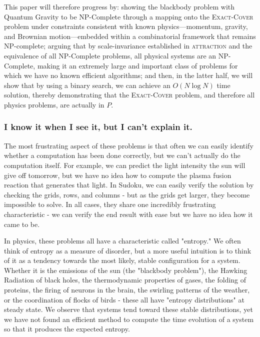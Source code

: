 \documentclass{report}
\begin{document}
This paper will therefore progress by: showing the blackbody problem with Quantum Gravity to be NP-Complete through a mapping onto the \textsc{Exact-Cover} problem under constraints consistent with known physics—momentum, gravity, and Brownian motion—embedded within a combinatorial framework that remains NP-complete; arguing that by scale-invariance established in \textsc{attraction}\cite{AbadirAttraction2024} and the equivalence of all NP-Complete problems, all physical systems are an NP-Complete, making it an extremely large and important class of problems for which we have no known efficient algorithms; and then, in the latter half, we will show that by using a binary search, we can achieve an \(O(N \log N)\) time solution, thereby demonstrating that the \textsc{Exact-Cover} problem, and therefore all physics problems, are actually in \(P\).


\subsubsection*{I know it when I see it, but I can't explain it.}
The most frustrating aspect of these problems is that often we can easily identify whether a computation has been done correctly, but we can't actually do the computation itself. For example, we can predict the light intensity the sun will give off tomorrow, but we have no idea how to compute the plasma fusion reaction that generates that light. In Sudoku, we can easily verify the solution by checking the grids, rows, and columns - but as the grids get larger, they become impossible to solve. In all cases, they share one incredibly frustrating characteristic - we can verify the end result with ease but we have no idea how it came to be.

In physics, these problems all have a characteristic called "entropy."  We often think of entropy as a measure of disorder, but a more useful intuition is to think of it as a tendency towards the most likely, stable configuration for a system. Whether it is the emissions of the sun (the "blackbody problem"), the Hawking Radiation of black holes, the thermodynamic properties of gases, the folding of proteins, the firing of neurons in the brain, the swirling patterns of the weather, or the coordination of flocks of birds - these all have "entropy distributions" at steady state.  We observe that systems tend toward these stable distributions, yet we have not found an efficient method to compute the time evolution of a system so that it produces the expected entropy.
\end{document}
